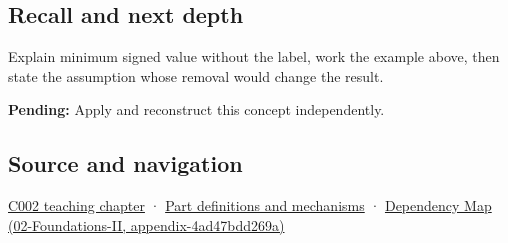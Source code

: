 \subsection{Recall and next depth}\label{recall-and-next-depth}

Explain minimum signed value without the label, work the example above, then state the assumption whose removal would change the result.

\textbf{Pending:} Apply and reconstruct this concept independently.

\subsection{Source and navigation}\label{source-and-navigation}

\href{Continuous\%20Notes/Computing\%20Foundations\%20-\%20From\%20Bits\%20to\%20C++\%20and\%20Systems\%20APIs\#Arithmetic\%20becomes\%20a\%20policy}{C002 teaching chapter} · \hyperref[appendix-fd090d982a15]{Part definitions and mechanisms} · \href{}{Dependency Map (02-Foundations-II, appendix-4ad47bdd269a)}
